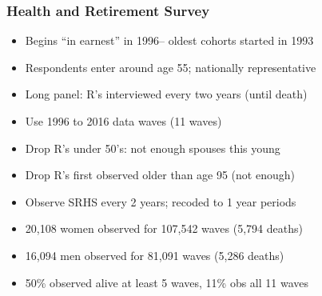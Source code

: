 \documentclass[aspectratio=169]{beamer}
\begin{document}
\begin{frame}\frametitle{Health and Retirement Survey}
\begin{itemize}
\item <1->Begins ``in earnest'' in 1996-- oldest cohorts started in 1993

\item <1->Respondents enter around age 55; nationally representative

\item <1->Long panel: R's interviewed every two years (until death)

\item <2->Use 1996 to 2016 data waves (11 waves)

\item <2->Drop R's under 50's: not enough spouses this young

\item <2->Drop R's first observed older than age 95 (not enough)

\item <2->Observe SRHS every 2 years; recoded to 1 year periods

\item <3->20,108 women observed for 107,542 waves (5,794 deaths)

\item <3->16,094 men observed for 81,091 waves (5,286 deaths)

\item <3->50\% observed alive at least 5 waves, 11\% obs all 11 waves
\end{itemize}
\end{frame}
\end{document}
